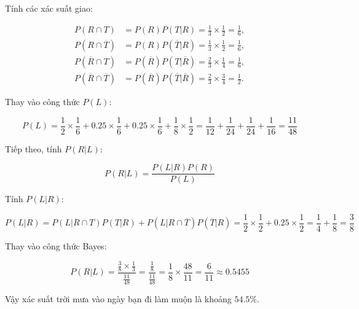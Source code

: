 \begin{ex}
{	Tính các xác suất giao:
	
	\begin{align*}
		P(R \cap T) &= P(R)P(T|R) = \frac{1}{3} \times \frac{1}{2} = \frac{1}{6}, \\
		P(R \cap \overline{T}) &= P(R)P(\overline{T}|R) = \frac{1}{3} \times \frac{1}{2} = \frac{1}{6}, \\
		P(\overline{R} \cap T) &= P(\overline{R})P(T|\overline{R}) = \frac{2}{3} \times \frac{1}{4} = \frac{1}{6}, \\
		P(\overline{R} \cap \overline{T}) &= P(\overline{R})P(\overline{T}|\overline{R}) = \frac{2}{3} \times \frac{3}{4} = \frac{1}{2}.
	\end{align*}
	
	Thay vào công thức \( P(L) \):
	
	\[
	P(L) = \frac{1}{2} \times \frac{1}{6} + 0.25 \times \frac{1}{6} + 0.25 \times \frac{1}{6} + \frac{1}{8} \times \frac{1}{2} = \frac{1}{12} + \frac{1}{24} + \frac{1}{24} + \frac{1}{16} = \frac{11}{48}
	\]
	
	Tiếp theo, tính \( P(R|L) \):
	
	\[
	P(R|L) = \frac{P(L|R)P(R)}{P(L)}
	\]
	
	Tính \( P(L|R) \):
	
	\[
	P(L|R) = P(L|R \cap T)P(T|R) + P(L|R \cap \overline{T})P(\overline{T}|R) = \frac{1}{2} \times \frac{1}{2} + 0.25 \times \frac{1}{2} = \frac{1}{4} + \frac{1}{8} = \frac{3}{8}
	\]
	
	Thay vào công thức Bayes:
	
	\[
	P(R|L) = \frac{\frac{3}{8} \times \frac{1}{3}}{\frac{11}{48}} = \frac{\frac{1}{8}}{\frac{11}{48}} = \frac{1}{8} \times \frac{48}{11} = \frac{6}{11} \approx 0.5455
	\]
	
	Vậy xác suất trời mưa vào ngày bạn đi làm muộn là khoảng \( 54.5\% \).
	}
\end{ex}


